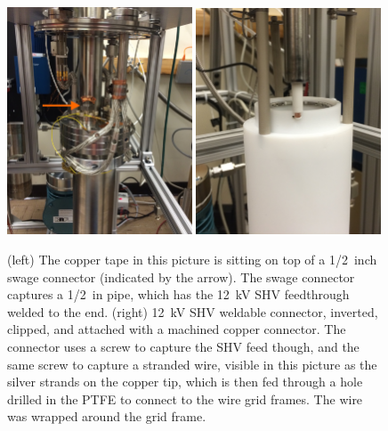 \begin{figure}[htbp]
\begin{center}
\includegraphics[width=0.49\textwidth]{figures/testbed/ft1_2.jpg}
\includegraphics[width=0.49\textwidth]{figures/testbed/ft1_1.jpg}
\caption{(left) The copper tape in this picture is sitting on top of a 1/2~inch swage connector (indicated by the arrow). The swage connector captures a 1/2~in pipe, which has the 12~kV \acs{SHV} feedthrough welded to the end. (right) 12~kV \acs{SHV} weldable connector, inverted, clipped, and attached with a machined copper connector. The connector uses a screw to capture the \acs{SHV} feed though, and the same screw to capture a stranded wire, visible in this picture as the silver strands on the copper tip, which is then fed through a hole drilled in the \acs{PTFE} to connect to the wire grid frames. The wire was wrapped around the grid frame. }
\label{fig:ft1}
\end{center}
\end{figure}


